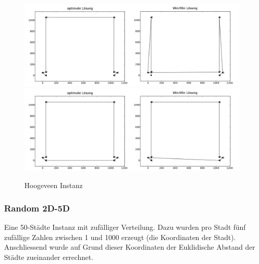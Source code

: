 \documentclass[11pt,a4paper]{article}
\begin{document}
\begin{figure}[H]
        \centering
        \includegraphics[width=16cm]{gfx/hoogeveen_hpp_comparison}
        \includegraphics[width=16cm]{gfx/hoogeveen_tsp_comparison}
        \caption{Hoogeveen Instanz}
        \label{img:hoogeveen_comparison}
\end{figure}

\subsubsection{Random 2D-5D}
Eine 50-Städte Instanz mit zufälliger Verteilung. Dazu wurden pro Stadt fünf zufällige Zahlen zwischen 1 und 1000 erzeugt (die Koordinaten der Stadt). Anschliessend wurde auf Grund dieser Koordinaten der Euklidische Abstand der Städte zueinander errechnet.
\end{document}
